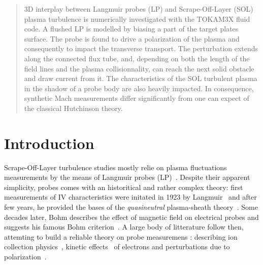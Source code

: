 \documentclass[cpp,a4paper,fleqn,twoside%
]{w-art}
\begin{document}
\address[\inst{3}]{Aix-Marseille Universit\'e, CNRS, PIIM, UMR 7345, Marseille
F-13397, France}
\def\andname{et}
\begin{abstract}
  
3D interplay between Langmuir probes (LP) and Scrape-Off-Layer (SOL) plasma
turbulence is numerically investigated with the TOKAM3X fluid
code. A flushed LP is modelled by biasing a part of the target plates
surface. The probe is found to drive a polarization of the plasma
and consequently to impact the transverse transport. The perturbation extends
along the connected flux tube, and, depending on both the length of the field
lines and the plasma collisionnality, can reach the next solid obstacle and draw
current from it. The characteristics of the SOL turbulent plasma in the shadow
of a probe body are also heavily impacted. In consequence, synthetic Mach
measurements differ significantly from one can expect of the classical
Hutchinson theory.

\end{abstract}
\maketitle                   %






\section{Introduction}

Scrape-Off-Layer turbulence studies mostly relie on
plasma fluctuations measurements by the means of Langmuir probes
(LP)~\cite{Langmuir23,Langmuir29,
Tonks29,Bohm49,Chen65,Matthews94,Stangeby00,Hutchinson02}. Despite their
apparent simplicity, probes comes with an historitical and rather complex theory: first
measurements of IV characteristics were initated in 1923 by
Langmuir~\cite{Langmuir23} and after few years, he provided
the bases of the \emph{quasineutral} plasma-sheath theory~\cite{Langmuir29,
Tonks29}. Some decades later, Bohm describes the effect of magnetic
field on electrical probes and suggests his famous Bohm
criterion~\cite{Bohm49}. A large body of litterature follow then, 
attemting to build a reliable theory on probe measuremens :
describing ion collection physics~\cite{Stangeby84,
Hutchinson87,Hutchinson88,Hutchinson91,Matthews89,Rozhansky99,HutchinsonPRL}, kinetic
effects~\cite{Stangeby95, Hutchinson10} of electrons and perturbations due to
polarization~\cite{Pitts90,Stangeby95-2,Zweben09,Ghendrih03,Colin14,Futtersack16}.
\end{document}
